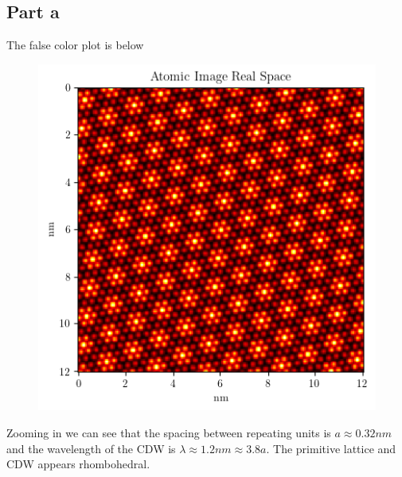 \subsection*{Part a}
The false color plot is below
\begin{figure}[H]
    \centering
    \includegraphics[width=0.75\linewidth]{Resources//140A//Homework 6/140A Homework 6 Problem 5a.png}
    \label{fig:enter-label}
\end{figure}
Zooming in we can see that the spacing between repeating units is $a\approx 0.32nm$ and the wavelength of the CDW is $\lambda \approx 1.2nm \approx 3.8a$. The primitive lattice and CDW appears rhombohedral.
